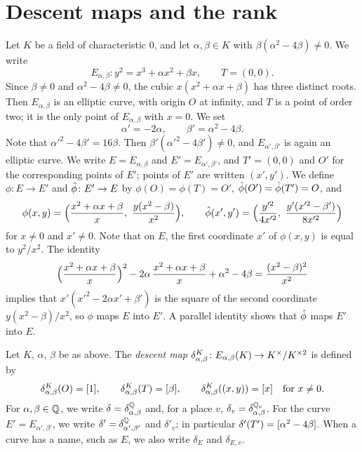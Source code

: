 \section{Descent maps and the rank}\label{sec:descent-maps}

Let $K$ be a field of characteristic $0$, and let $\alpha,\beta\in K$ with $\beta(\alpha^2-4\beta)\ne0$. We write
\begin{equation}\label{eq:E-alpha-beta}
E_{\alpha,\beta}\colon y^2=x^3+\alpha x^2+\beta x,\qquad T=(0,0).
\end{equation}
Since $\beta\ne0$ and $\alpha^2-4\beta\ne0$, the cubic $x(x^2+\alpha x+\beta)$ has three distinct roots. Then $E_{\alpha,\beta}$ is an elliptic curve, with origin $O$ at infinity, and $T$ is a point of order two; it is the only point of $E_{\alpha,\beta}$ with $x=0$. We set
\begin{equation}\label{eq:isogenous-coefficients}
\alpha'=-2\alpha,\qquad\beta'=\alpha^2-4\beta.
\end{equation}
Note that $\alpha'^2-4\beta'=16\beta$. Then $\beta'(\alpha'^2-4\beta')\ne0$, and $E_{\alpha',\beta'}$ is again an elliptic curve. We write $E=E_{\alpha,\beta}$ and $E'=E_{\alpha',\beta'}$, and $T'=(0,0)$ and $O'$ for the corresponding points of $E'$; points of $E'$ are written $(x',y')$. We define $\phi\colon E\to E'$ and $\hat\phi\colon E'\to E$ by $\phi(O)=\phi(T)=O'$, $\hat\phi(O')=\hat\phi(T')=O$, and
\begin{equation}\label{eq:isogenies}
\phi(x,y)=\Bigl(\frac{x^2+\alpha x+\beta}{x},\ \frac{y(x^2-\beta)}{x^2}\Bigr),\qquad
\dual(x',y')=\Bigl(\frac{y'^2}{4x'^2},\ \frac{y'(x'^2-\beta')}{8x'^2}\Bigr)
\end{equation}
for $x\ne0$ and $x'\ne0$. Note that on $E$, the first coordinate $x'$ of $\phi(x,y)$ is equal to $y^2/x^2$. The identity
\begin{equation}\label{eq:phi-into-Eprime}
\Bigl(\frac{x^2+\alpha x+\beta}{x}\Bigr)^2-2\alpha\,\frac{x^2+\alpha x+\beta}{x}+\alpha^2-4\beta=\frac{(x^2-\beta)^2}{x^2}
\end{equation}
implies that $x'(x'^2-2\alpha x'+\beta')$ is the square of the second coordinate $y(x^2-\beta)/x^2$, so $\phi$ maps $E$ into $E'$. A parallel identity shows that $\hat\phi$ maps $E'$ into $E$.

\begin{definition}\label{def:descent-map}
Let $K$, $\alpha$, $\beta$ be as above. The \emph{descent map} $\delta^K_{\alpha,\beta}\colon E_{\alpha,\beta}(K)\to K^{\times}/K^{\times2}$ is defined by
\begin{equation}\label{eq:descent-map}
\delta^K_{\alpha,\beta}(O)=[1],\qquad\delta^K_{\alpha,\beta}(T)=[\beta],\qquad\delta^K_{\alpha,\beta}((x,y))=[x]\quad\text{for }x\ne0.
\end{equation}
For $\alpha,\beta\in\mathbb Q$, we write $\delta=\delta^{\mathbb Q}_{\alpha,\beta}$ and, for a place $v$, $\delta_v=\delta^{\mathbb Q_v}_{\alpha,\beta}$. For the curve $E'=E_{\alpha',\beta'}$, we write $\delta'=\delta^{\mathbb Q}_{\alpha',\beta'}$ and $\delta'_v$; in particular $\delta'(T')=[\alpha^2-4\beta]$. When a curve has a name, such as $E$, we also write $\delta_E$ and $\delta_{E,v}$.
\end{definition}

